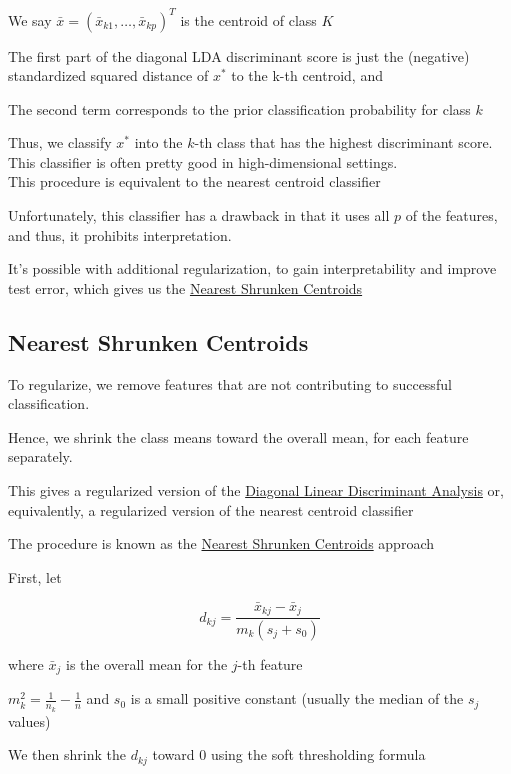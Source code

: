 \documentclass[
]{book}
\begin{document}
We say \(\bar{x}= (\bar{x}_{k1}, \dots, \bar{x}_{kp})^T\) is the centroid of class \(K\)

The first part of the diagonal LDA discriminant score is just the (negative) standardized squared distance of \(x^*\) to the k-th centroid, and

The second term corresponds to the prior classification probability for class \(k\)

Thus, we classify \(x^*\) into the \(k\)-th class that has the highest discriminant score. This classifier is often pretty good in high-dimensional settings.\\
This procedure is equivalent to the nearest centroid classifier

Unfortunately, this classifier has a drawback in that it uses all \(p\) of the features, and thus, it prohibits interpretation.

It's possible with additional regularization, to gain interpretability and improve test error, which gives us the \protect\hyperlink{nearest-shrunken-centroids}{Nearest Shrunken Centroids}

\hypertarget{nearest-shrunken-centroids}{%
\subsection{Nearest Shrunken Centroids}\label{nearest-shrunken-centroids}}

To regularize, we remove features that are not contributing to successful classification.

Hence, we shrink the class means toward the overall mean, for each feature separately.

This gives a regularized version of the \protect\hyperlink{diagonal-linear-discriminant-analysis}{Diagonal Linear Discriminant Analysis} or, equivalently, a regularized version of the nearest centroid classifier

The procedure is known as the \protect\hyperlink{nearest-shrunken-centroids}{Nearest Shrunken Centroids} approach

First, let

\[
d_{kj} = \frac{\bar{x}_{kj} - \bar{x}_j}{m_k (s_j + s_0)}
\]

where \(\bar{x}_j\) is the overall mean for the \(j\)-th feature

\(m^2_k = \frac{1}{n_k} - \frac{1}{n}\) and \(s_0\) is a small positive constant (usually the median of the \(s_j\) values)

We then shrink the \(d_{kj}\) toward 0 using the soft thresholding formula
\end{document}
